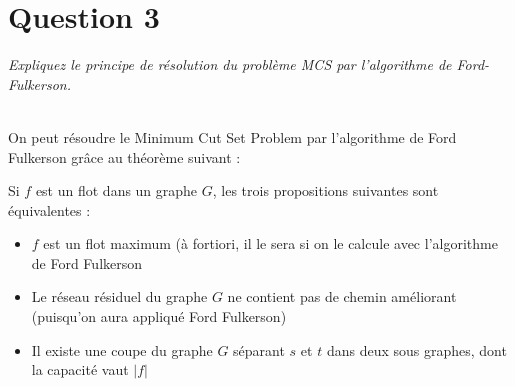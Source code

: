 \section{Question 3}
\textit{Expliquez le principe de résolution du problème MCS par l'algorithme de Ford-Fulkerson.}\\~\\\par
On peut résoudre le Minimum Cut Set Problem par l'algorithme de Ford Fulkerson grâce au théorème suivant :\\\par
Si $f$ est un flot dans un graphe $G$, les trois propositions suivantes sont équivalentes :\\
\begin{itemize}
 \item $f$ est un flot maximum (à fortiori, il le sera si on le calcule avec l'algorithme de Ford Fulkerson
 \item Le réseau résiduel du graphe $G$ ne contient pas de chemin améliorant (puisqu'on aura appliqué Ford Fulkerson)
 \item Il existe une coupe du graphe $G$ séparant $s$ et $t$ dans deux sous graphes, dont la capacité vaut $|f|$
\end{itemize}

